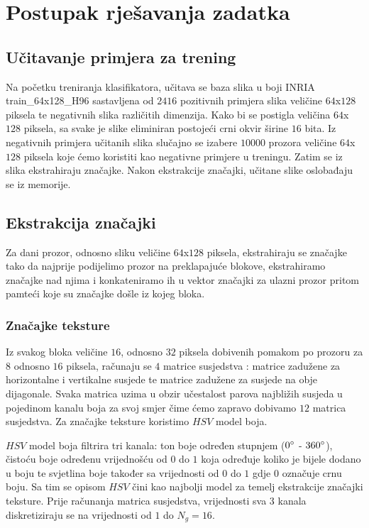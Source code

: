 \documentclass[seminar]{fer}
\begin{document}
\chapter{Postupak rješavanja zadatka}
\section{Učitavanje primjera za trening}
Na početku treniranja klasifikatora, učitava se baza slika u boji INRIA  train\_64x128\_H96 sastavljena od $2416$ pozitivnih primjera slika veličine $64$x$128$ piksela te negativnih slika različitih dimenzija. Kako bi se postigla veličina $64$x$128$ piksela, sa svake je slike eliminiran postojeći crni okvir širine $16$ bita. Iz negativnih primjera učitanih slika slučajno se izabere $10000$ prozora veličine $64$x$128$ piksela koje ćemo koristiti kao negativne primjere u treningu. Zatim se iz slika ekstrahiraju značajke. Nakon ekstrakcije značajki, učitane slike oslobađaju se iz memorije. 

\section{Ekstrakcija značajki}
Za dani prozor, odnosno sliku veličine $64$x$128$ piksela, ekstrahiraju se značajke tako da najprije podijelimo prozor na preklapajuće blokove, ekstrahiramo značajke nad njima i konkateniramo ih u vektor značajki za ulazni prozor pritom pamteći koje su značajke došle iz kojeg bloka.

\subsection{Značajke teksture}
Iz svakog bloka veličine $16$, odnosno $32$ piksela dobivenih pomakom po prozoru za $8$ odnosno $16$ piksela, računaju se $4$ 
 matrice susjedstva : matrice zadužene za horizontalne i vertikalne susjede te matrice zadužene za susjede na obje dijagonale. Svaka matrica uzima u obzir učestalost parova najbližih susjeda u pojedinom kanalu boja za svoj smjer čime ćemo zapravo dobivamo $12$ matrica susjedstva. Za značajke teksture koristimo $HSV$  model boja. 
 
$HSV$ model boja filtrira tri kanala: ton boje  određen stupnjem ($0\degree$ - $360\degree$), čistoću boje  određenu vrijednošću od $0$ do $1$ koja određuje koliko je bijele dodano u boju te svjetlina boje također sa vrijednosti od $0$ do $1$ gdje $0$ označuje crnu boju. Sa tim se opisom $HSV$ čini kao najbolji model za temelj ekstrakcije značajki teksture. Prije računanja matrica susjedstva, vrijednosti sva 3 kanala diskretiziraju se na vrijednosti od $1$ do $N_g = 16$.
\end{document}

